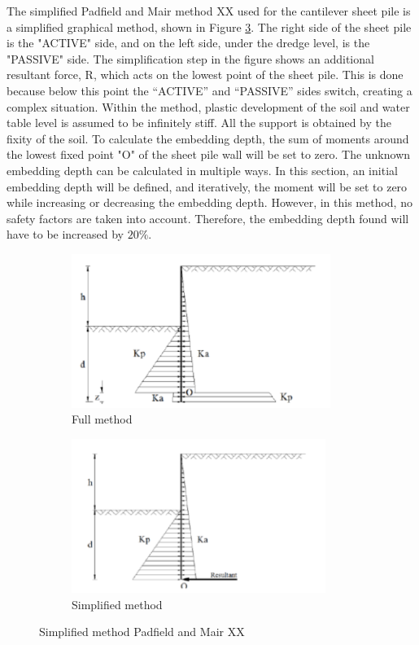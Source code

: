 The simplified Padfield and Mair method XX used for the cantilever sheet pile is a simplified graphical method, shown in Figure \ref{fig:blum}. The right side of the sheet pile is the "ACTIVE" side, and on the left side, under the dredge level, is the "PASSIVE" side. The simplification step in the figure shows an additional resultant force, R, which acts on the lowest point of the sheet pile. This is done because below this point the “ACTIVE” and “PASSIVE” sides switch, creating a complex situation. Within the method, plastic development of the soil and water table level is assumed to be infinitely stiff. All the support is obtained by the fixity of the soil. To calculate the embedding depth, the sum of moments around the lowest fixed point "O" of the sheet pile wall will be set to zero. The unknown embedding depth can be calculated in multiple ways. In this section, an initial embedding depth will be defined, and iteratively, the moment will be set to zero while increasing or decreasing the embedding depth. However, in this method, no safety factors are taken into account. Therefore, the embedding depth found will have to be increased by $20\%$.

\begin{figure}[H]
    \centering
    \begin{subfigure}[b]{0.45\textwidth}
        \includegraphics[width=\linewidth, height=5cm]{figures/ch8/blum_1.png}
        \caption{Full method}
        \label{fig:conventional_design}
    \end{subfigure}
    \hfill
    \begin{subfigure}[b]{0.45\textwidth}
        \includegraphics[width=\linewidth, height=5cm]{figures/ch8/blum_2.png}
        \caption{Simplified method}
        \label{fig:blum_simplification}
    \end{subfigure}
    \caption{Simplified method Padfield and Mair XX}
    \label{fig:blum}
\end{figure}

